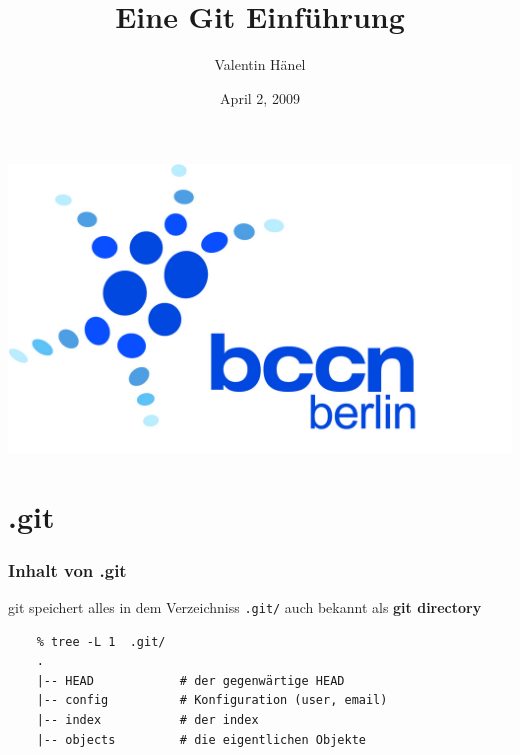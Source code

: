 \documentclass{beamer}
\author{Valentin H\"anel}
\institute{Bernstein Center for Computational Neuroscience Berlin}
\title{Eine Git Einführung}
\date{April 2, 2009}
\begin{document}

\begin{frame}
	\includegraphics[scale=0.05]{BCCN_logo_berlin.jpg}
	\titlepage
\end{frame}




\section{.git}

\begin{frame}[fragile]
\frametitle{Inhalt von .git}

git speichert alles in dem Verzeichniss {\tt.git/} auch bekannt als \textbf{git
directory}

\begin{verbatim}
    % tree -L 1  .git/
    .
    |-- HEAD            # der gegenwärtige HEAD
    |-- config          # Konfiguration (user, email)
    |-- index           # der index
    |-- objects         # die eigentlichen Objekte

\end{verbatim}

\end{frame}



\end{document}
